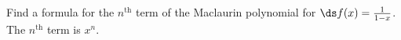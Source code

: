 {Find a formula for the $n^\text{th}$ term of the Maclaurin polynomial for $\ds f(x)=\frac{1}{1-x}$.
}
{The $n^\text{th}$ term is $x^n$.
}